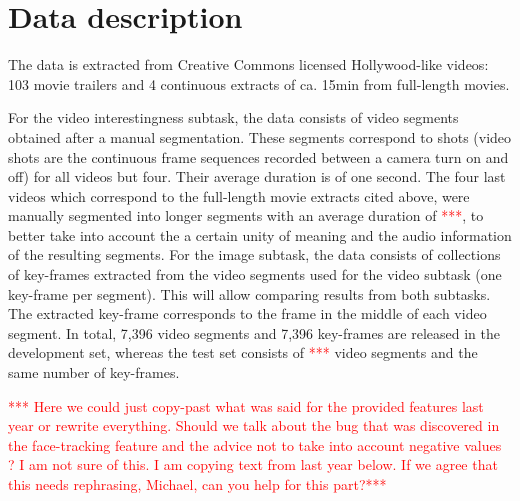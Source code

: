 \documentclass[sigconf]{acmart-me}
\begin{document}
\section{Data description}

The data is extracted from Creative Commons licensed Hollywood-like videos: 103 movie trailers and 4 continuous extracts of ca. 15min from full-length movies. 

For the video interestingness subtask, the data consists of video segments obtained after a manual segmentation. These segments correspond to shots (video shots are the continuous frame sequences recorded between a camera turn on and off) for all videos but four. Their average duration is of one second. The four last videos which correspond to the full-length movie extracts cited above, were manually segmented into longer segments with an average duration of \textcolor{red}{***}, to better take into account the a certain unity of meaning and the audio information of the resulting segments. For the image subtask, the data consists of collections of key-frames extracted from the video segments used for the video subtask (one key-frame per segment). This will allow comparing results from both subtasks. The extracted key-frame corresponds to the frame in the middle of each video segment.
In total, 7,396 video segments and 7,396 key-frames are released in the development set, whereas the test set consists of \textcolor{red}{***} video segments and the same number of key-frames.

\textcolor{red}{*** Here we could just copy-past what was said for the provided features last year or rewrite everything. Should we talk about the bug that was discovered in the face-tracking feature and the advice not to take into account negative values ? I am not sure of this. I am copying text from last year below. If we agree that this needs rephrasing, Michael, can you help for this part?***}
\end{document}
